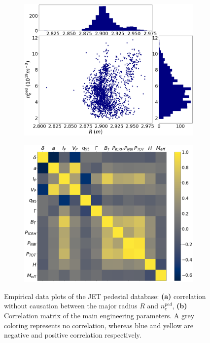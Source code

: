 \documentclass[a4paper, twoside, final, 12pt]{article}
\begin{document}
\begin{figure}[h]
        \centering
        \begin{subfigure}{0.5\linewidth}
                \centering
                \includegraphics[scale=0.2]{./src/R_vs_NEPED_matplotlib}
                \caption{}
                \label{subfig:icecream}
        \end{subfigure} \hfill
        \begin{subfigure}{0.45\linewidth}
                \centering
                \includegraphics[scale=0.2]{./src/input_correlations}
                \caption{}
                \label{subfig:corr}
        \end{subfigure}
	\caption{Empirical data plots of the JET pedestal database: \textbf{(a)} correlation without causation between the major radius $R$ and $n_e^{ped}$,  \textbf{(b)}  Correlation matrix of the main engineering parameters. A grey coloring represents no correlation, whereas blue and yellow are negative and positive correlation respectively.}
	\label{fig:emperical}
\end{figure}
\end{document}
